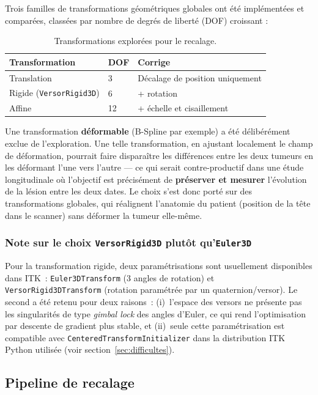 \documentclass[11pt,a4paper]{article}
\begin{document}
Trois familles de transformations géométriques globales ont été implémentées
et comparées, classées par nombre de degrés de liberté (DOF) croissant :

\begin{table}[H]
\centering
\begin{tabular}{@{}lll@{}}
\toprule
\textbf{Transformation} & \textbf{DOF} & \textbf{Corrige} \\
\midrule
Translation & 3 & Décalage de position uniquement \\
Rigide (\texttt{VersorRigid3D}) & 6 & + rotation \\
Affine & 12 & + échelle et cisaillement \\
\bottomrule
\end{tabular}
\caption{Transformations explorées pour le recalage.}
\end{table}

Une transformation \textbf{déformable} (B-Spline par exemple) a été
délibérément exclue de l'exploration. Une telle transformation, en
ajustant localement le champ de déformation, pourrait faire disparaître les
différences entre les deux tumeurs en les déformant l'une vers l'autre — ce
qui serait contre-productif dans une étude longitudinale où l'objectif est
précisément de \textbf{préserver et mesurer} l'évolution de la lésion entre
les deux dates. Le choix s'est donc porté sur des transformations globales,
qui réalignent l'anatomie du patient (position de la tête dans le scanner)
sans déformer la tumeur elle-même.

\subsubsection*{Note sur le choix \texttt{VersorRigid3D} plutôt qu'\texttt{Euler3D}}

Pour la transformation rigide, deux paramétrisations sont usuellement
disponibles dans ITK~: \texttt{Euler3DTransform} (3 angles de rotation) et
\texttt{VersorRigid3DTransform} (rotation paramétrée par un quaternion/versor).
Le second a été retenu pour deux raisons~: (i)~l'espace des versors ne
présente pas les singularités de type \emph{gimbal lock} des angles d'Euler,
ce qui rend l'optimisation par descente de gradient plus stable, et (ii)~seule
cette paramétrisation est compatible avec
\texttt{CenteredTransformInitializer} dans la distribution ITK Python utilisée
(voir section~\ref{sec:difficultes}).

\subsection{Pipeline de recalage}
\end{document}
